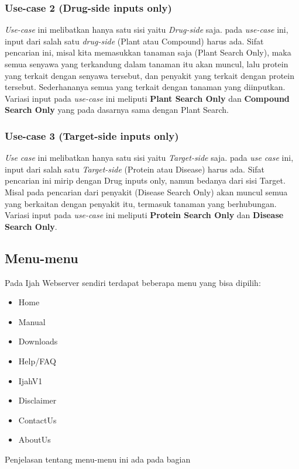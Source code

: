 		\subsubsection{Use-case 2 (Drug-side inputs only)} \label{drug only}
		\emph{Use-case} ini melibatkan hanya satu sisi yaitu \emph{Drug-side} saja. pada \emph{use-case} ini, input dari salah satu \emph{drug-side} (Plant atau Compound) harus ada. Sifat pencarian ini, misal kita memasukkan tanaman saja (Plant Search Only), maka semua senyawa yang terkandung dalam tanaman itu akan muncul, lalu protein yang terkait dengan senyawa tersebut, dan penyakit yang terkait dengan protein tersebut. Sederhananya semua yang terkait dengan tanaman yang diinputkan. Variasi input pada \emph{use-case} ini meliputi \textbf{Plant Search Only} dan \textbf{Compound Search Only} yang pada dasarnya sama dengan Plant Search.
		\subsubsection{Use-case 3 (Target-side inputs only)} \label{target only}
		\emph{Use case} ini melibatkan hanya satu sisi yaitu \emph{Target-side} saja. pada \emph{use case} ini, input dari salah satu \emph{Target-side} (Protein atau Disease) harus ada. Sifat pencarian ini mirip dengan Drug inputs only, namun bedanya dari sisi Target. Misal pada pencarian dari penyakit (Disease Search Only) akan muncul semua yang berkaitan dengan penyakit itu, termasuk tanaman yang berhubungan. Variasi input pada \emph{use-case} ini meliputi \textbf{Protein Search Only} dan \textbf{Disease Search Only}.


	\subsection{Menu-menu} %
	Pada Ijah Webserver sendiri terdapat beberapa menu yang bisa dipilih:
	\begin{itemize}
	\item Home
	\item Manual
	\item Downloads
	\item Help/FAQ
	\item IjahV1
	\item Disclaimer
	\item ContactUs
	\item AboutUs
	\end{itemize}
	Penjelasan tentang menu-menu ini ada pada bagian \textbf{}



